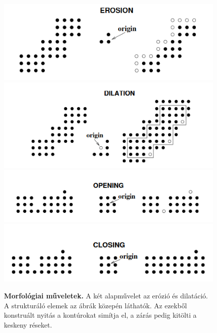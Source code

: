 \documentclass[12pt]{article}
\theoremstyle{plain}
\begin{document}
\begin{figure}[H]
    \begin{center}
    \includegraphics[width=0.65\linewidth]{media/er.png}
    \includegraphics[width=0.65\linewidth]{media/dil.png}
    \includegraphics[width=0.65\linewidth]{media/open.png}
    \includegraphics[width=0.65\linewidth]{media/clos.png}
    \caption{\textbf{Morfológiai műveletek.} A két alapművelet az erózió és dilatáció. A strukturáló elemek az ábrák közepén láthatók. Az ezekből konstruált nyitás a kontúrokat simítja el, a zárás pedig kitölti a keskeny réseket.} 
    \label{fig:morf}
    \end{center}
\end{figure}
\end{document}

